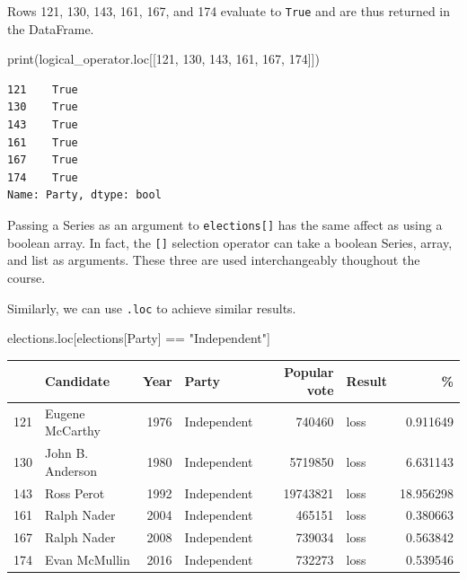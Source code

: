 \documentclass[
  letterpaper,
  DIV=11,
  numbers=noendperiod]{scrreprt}
\newenvironment{Shaded}{\begin{snugshade}}{\end{snugshade}}
\newcommand{\BuiltInTok}[1]{\textcolor[rgb]{0.00,0.23,0.31}{#1}}
\newcommand{\DecValTok}[1]{\textcolor[rgb]{0.68,0.00,0.00}{#1}}
\newcommand{\NormalTok}[1]{\textcolor[rgb]{0.00,0.23,0.31}{#1}}
\newcommand{\OperatorTok}[1]{\textcolor[rgb]{0.37,0.37,0.37}{#1}}
\newcommand{\StringTok}[1]{\textcolor[rgb]{0.13,0.47,0.30}{#1}}
\begin{document}
Rows 121, 130, 143, 161, 167, and 174 evaluate to \texttt{True} and are
thus returned in the DataFrame.

\begin{Shaded}
\begin{Highlighting}[]
\BuiltInTok{print}\NormalTok{(logical\_operator.loc[[}\DecValTok{121}\NormalTok{, }\DecValTok{130}\NormalTok{, }\DecValTok{143}\NormalTok{, }\DecValTok{161}\NormalTok{, }\DecValTok{167}\NormalTok{, }\DecValTok{174}\NormalTok{]])}
\end{Highlighting}
\end{Shaded}

\begin{verbatim}
121    True
130    True
143    True
161    True
167    True
174    True
Name: Party, dtype: bool
\end{verbatim}

Passing a Series as an argument to \texttt{elections{[}{]}} has the same
affect as using a boolean array. In fact, the \texttt{{[}{]}} selection
operator can take a boolean Series, array, and list as arguments. These
three are used interchangeably thoughout the course.

Similarly, we can use \texttt{.loc} to achieve similar results.

\begin{Shaded}
\begin{Highlighting}[]
\NormalTok{elections.loc[elections[}\StringTok{\textquotesingle{}Party\textquotesingle{}}\NormalTok{] }\OperatorTok{==} \StringTok{"Independent"}\NormalTok{]}
\end{Highlighting}
\end{Shaded}

\begin{tabular}{llrlrlr}
\toprule
{} &         Candidate &  Year &        Party &  Popular vote & Result &          \% \\
\midrule
121 &   Eugene McCarthy &  1976 &  Independent &        740460 &   loss &   0.911649 \\
130 &  John B. Anderson &  1980 &  Independent &       5719850 &   loss &   6.631143 \\
143 &        Ross Perot &  1992 &  Independent &      19743821 &   loss &  18.956298 \\
161 &       Ralph Nader &  2004 &  Independent &        465151 &   loss &   0.380663 \\
167 &       Ralph Nader &  2008 &  Independent &        739034 &   loss &   0.563842 \\
174 &     Evan McMullin &  2016 &  Independent &        732273 &   loss &   0.539546 \\
\bottomrule
\end{tabular}
\end{document}
